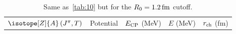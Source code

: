 \documentclass[aps,prc,twocolumn,superscriptaddress,floatfix]{revtex4-1}
\begin{document}
\begin{table}[htb]
\centering
\caption[]{Same as~\cref{tab:10} but for the $R_0=1.2\,\rm fm$ cutoff.}
\begin{tabular}{llccc}
\hline\hline
$\isotope[Z]{A}\,(J^\pi,T)$ & Potential & $E_{\rm CP}$ (MeV) & $E$ (MeV) & $r_{\rm ch}$ (fm) \\

\end{tabular}
\end{table}
\end{document}

